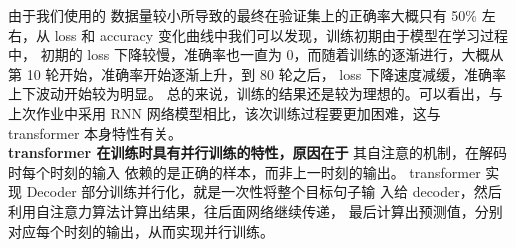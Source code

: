 \documentclass[a4paper]{article}
\begin{document}
\hspace{2em}由于我们使用的
数据量较小所导致的最终在验证集上的正确率大概只有 50\% 左右，从 loss
和 accuracy 变化曲线中我们可以发现，训练初期由于模型在学习过程中，
初期的 loss 下降较慢，准确率也一直为 0，而随着训练的逐渐进行，大概从
第 10 轮开始，准确率开始逐渐上升，到 80 轮之后，
loss 下降速度减缓，准确率上下波动开始较为明显。
总的来说，训练的结果还是较为理想的。可以看出，与上次作业中采用 RNN 网络模型相比，该次训练过程要更加困难，这与 transformer 本身特性有关。\\
\hspace{2em}
\textbf{transformer 在训练时具有并行训练的特性，原因在于}
其自注意的机制，在解码时每个时刻的输入
依赖的是正确的样本，而非上一时刻的输出。
transformer 实现 Decoder 部分训练并行化，就是一次性将整个目标句子输
入给 decoder，然后利用自注意力算法计算出结果，往后面网络继续传递，
最后计算出预测值，分别对应每个时刻的输出，从而实现并行训练。
\end{document}
